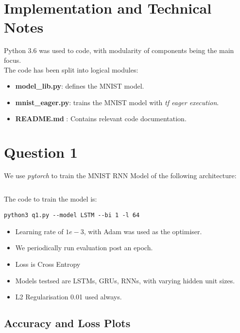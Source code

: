 \section {Implementation and Technical Notes}

Python 3.6 was used to code, with modularity of components being the main focus. \\

The code has been split into logical modules: \\
\begin{itemize}
\item \textbf{model\_lib.py}: defines the MNIST model. 
\item \textbf{mnist\_eager.py}: trains the MNIST model with \textit{tf eager execution}. 
\item  \textbf{README.md }: Contains relevant code documentation.
\end{itemize}


\section {Question 1}

We use \textit{pytorch } to train the MNIST RNN Model of the following architecture:

\begin{lstlisting}

\end{lstlisting}

The code to train the model is:

\begin{lstlisting}
python3 q1.py --model LSTM --bi 1 -l 64
\end{lstlisting}

\begin{itemize}
\item Learning rate of $1e-3$, with Adam was used as the optimiser.
\item We periodically run evaluation post an epoch. 
\item Loss is Cross Entropy
\item Models testsed are LSTMs, GRUs, RNNs, with varying hidden unit sizes.
\item L2 Regularisation 0.01 used always.
\end{itemize}

\subsection{Accuracy and Loss Plots}

